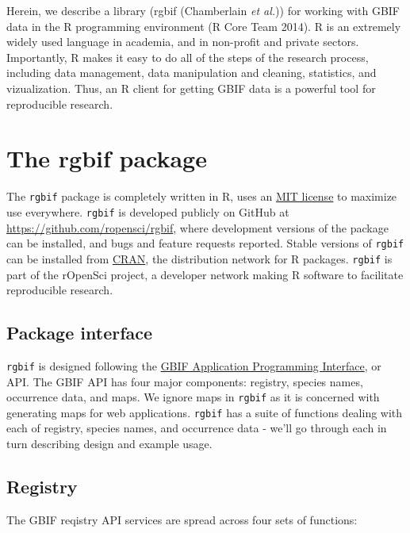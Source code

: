 \documentclass[author-year, review, 11pt]{components/elsarticle} %
\begin{document}
Herein, we describe a library (rgbif (Chamberlain \emph{et al.})) for
working with GBIF data in the R programming environment (R Core Team
2014). R is an extremely widely used language in academia, and in
non-profit and private sectors. Importantly, R makes it easy to do all
of the steps of the research process, including data management, data
manipulation and cleaning, statistics, and vizualization. Thus, an R
client for getting GBIF data is a powerful tool for reproducible
research.

\section{The rgbif package}\label{the-rgbif-package}

The \texttt{rgbif} package is completely written in R, uses an
\href{http://choosealicense.com/licenses/mit/}{MIT license} to maximize
use everywhere. \texttt{rgbif} is developed publicly on GitHub at
\href{https://github.com/ropensci/rgbif}{\url{https://github.com/ropensci/rgbif}},
where development versions of the package can be installed, and bugs and
feature requests reported. Stable versions of \texttt{rgbif} can be
installed from
\href{https://cran.rstudio.com/web/packages/rgbif/}{CRAN}, the
distribution network for R packages. \texttt{rgbif} is part of the
rOpenSci project, a developer network making R software to facilitate
reproducible research.

\subsection{Package interface}\label{package-interface}

\texttt{rgbif} is designed following the
\href{http://www.gbif.org/developer/summary}{GBIF Application
Programming Interface}, or API. The GBIF API has four major components:
registry, species names, occurrence data, and maps. We ignore maps in
\texttt{rgbif} as it is concerned with generating maps for web
applications. \texttt{rgbif} has a suite of functions dealing with each
of registry, species names, and occurrence data - we'll go through each
in turn describing design and example usage.

\subsection{Registry}\label{registry}

The GBIF reqistry API services are spread across four sets of functions:
\end{document}
